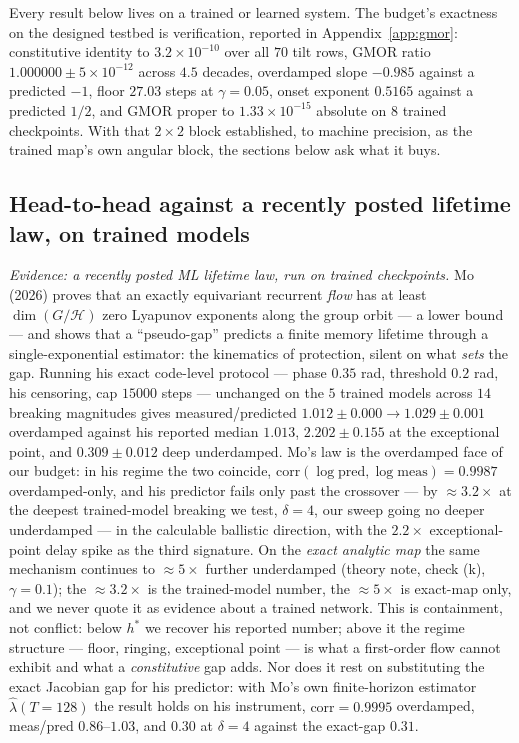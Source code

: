 \documentclass{article}
\begin{document}
Every result below lives on a trained or learned system. The budget's exactness on the designed testbed is verification, reported in Appendix~\ref{app:gmor}: constitutive identity to $3.2\!\times\!10^{-10}$ over all $70$ tilt rows, GMOR ratio $1.000000\pm5\!\times\!10^{-12}$ across $4.5$ decades, overdamped slope $-0.985$ against a predicted $-1$, floor $27.03$ steps at $\gamma=0.05$, onset exponent $0.5165$ against a predicted $1/2$, and GMOR proper to $1.33\!\times\!10^{-15}$ absolute on $8$ trained checkpoints. With that $2\times2$ block established, to machine precision, as the trained map's own angular block, the sections below ask what it buys.

\subsection{Head-to-head against a recently posted lifetime law, on trained models}\label{sec:mo}

\emph{Evidence: a recently posted ML lifetime law, run on trained checkpoints.} Mo (2026) proves that an exactly equivariant recurrent \emph{flow} has at least $\dim(G/\mathcal H)$ zero Lyapunov exponents along the group orbit --- a lower bound --- and shows that a ``pseudo-gap'' predicts a finite memory lifetime through a single-exponential estimator: the kinematics of protection, silent on what \emph{sets} the gap. Running his exact code-level protocol --- phase $0.35$ rad, threshold $0.2$ rad, his censoring, cap $15000$ steps --- unchanged on the $5$ trained models across $14$ breaking magnitudes gives measured/predicted $1.012\pm0.000\to1.029\pm0.001$ overdamped against his reported median $1.013$, $2.202\pm0.155$ at the exceptional point, and $0.309\pm0.012$ deep underdamped. Mo's law is the overdamped face of our budget: in his regime the two coincide, $\mathrm{corr}(\log\mathrm{pred},\log\mathrm{meas})=0.9987$ overdamped-only, and his predictor fails only past the crossover --- by $\approx3.2\times$ at the deepest trained-model breaking we test, $\delta=4$, our sweep going no deeper underdamped --- in the calculable ballistic direction, with the $2.2\times$ exceptional-point delay spike as the third signature. On the \emph{exact analytic map} the same mechanism continues to $\approx5\times$ further underdamped (theory note, check (k), $\gamma=0.1$); the $\approx3.2\times$ is the trained-model number, the $\approx5\times$ is exact-map only, and we never quote it as evidence about a trained network. This is containment, not conflict: below $h^*$ we recover his reported number; above it the regime structure --- floor, ringing, exceptional point --- is what a first-order flow cannot exhibit and what a \emph{constitutive} gap adds. Nor does it rest on substituting the exact Jacobian gap for his predictor: with Mo's own finite-horizon estimator $\hat\lambda(T{=}128)$ the result holds on his instrument, $\mathrm{corr}=0.9995$ overdamped, meas/pred $0.86$--$1.03$, and $0.30$ at $\delta=4$ against the exact-gap $0.31$.
\end{document}
